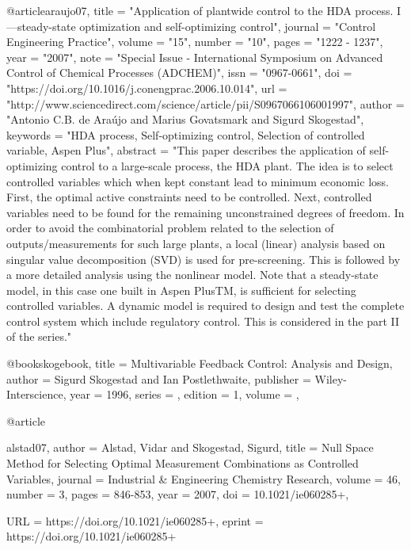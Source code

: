 @article{araujo07,
title = "Application of plantwide control to the HDA process. I—steady-state optimization and self-optimizing control",
journal = "Control Engineering Practice",
volume = "15",
number = "10",
pages = "1222 - 1237",
year = "2007",
note = "Special Issue - International Symposium on Advanced Control of Chemical Processes (ADCHEM)",
issn = "0967-0661",
doi = "https://doi.org/10.1016/j.conengprac.2006.10.014",
url = "http://www.sciencedirect.com/science/article/pii/S0967066106001997",
author = "Antonio C.B. de Araújo and Marius Govatsmark and Sigurd Skogestad",
keywords = "HDA process, Self-optimizing control, Selection of controlled variable, Aspen Plus",
abstract = "This paper describes the application of self-optimizing control to a large-scale process, the HDA plant. The idea is to select controlled variables which when kept constant lead to minimum economic loss. First, the optimal active constraints need to be controlled. Next, controlled variables need to be found for the remaining unconstrained degrees of freedom. In order to avoid the combinatorial problem related to the selection of outputs/measurements for such large plants, a local (linear) analysis based on singular value decomposition (SVD) is used for pre-screening. This is followed by a more detailed analysis using the nonlinear model. Note that a steady-state model, in this case one built in Aspen PlusTM, is sufficient for selecting controlled variables. A dynamic model is required to design and test the complete control system which include regulatory control. This is considered in the part II of the series."
}

@book{skogebook,
   title =     {Multivariable Feedback Control: Analysis and Design},
   author =    {Sigurd Skogestad and Ian Postlethwaite},
   publisher = {Wiley-Interscience},
   year =      {1996},
   series =    {},
   edition =   {1},
   volume =    {},
}

@article{alstad07,
author = {Alstad, Vidar and Skogestad, Sigurd},
title = {Null Space Method for Selecting Optimal Measurement Combinations as Controlled Variables},
journal = {Industrial \& Engineering Chemistry Research},
volume = {46},
number = {3},
pages = {846-853},
year = {2007},
doi = {10.1021/ie060285+},

URL = {https://doi.org/10.1021/ie060285+},
eprint = { 
        https://doi.org/10.1021/ie060285+}

}

